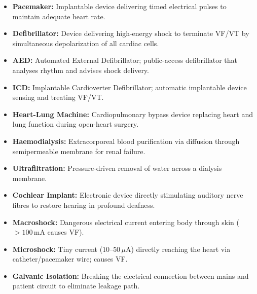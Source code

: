 \documentclass[12pt,a4paper]{article}
\begin{document}
\begin{tcolorbox}[defbox, title={\textbf{One-Line Definitions}}]
\begin{itemize}[leftmargin=*, itemsep=2.5pt, topsep=0pt]
  \item \textbf{Pacemaker:} Implantable device delivering timed electrical pulses to maintain adequate heart rate.
  \item \textbf{Defibrillator:} Device delivering high-energy shock to terminate VF/VT by simultaneous depolarization of all cardiac cells.
  \item \textbf{AED:} Automated External Defibrillator; public-access defibrillator that analyses rhythm and advises shock delivery.
  \item \textbf{ICD:} Implantable Cardioverter Defibrillator; automatic implantable device sensing and treating VF/VT.
  \item \textbf{Heart-Lung Machine:} Cardiopulmonary bypass device replacing heart and lung function during open-heart surgery.
  \item \textbf{Haemodialysis:} Extracorporeal blood purification via diffusion through semipermeable membrane for renal failure.
  \item \textbf{Ultrafiltration:} Pressure-driven removal of water across a dialysis membrane.
  \item \textbf{Cochlear Implant:} Electronic device directly stimulating auditory nerve fibres to restore hearing in profound deafness.
  \item \textbf{Macroshock:} Dangerous electrical current entering body through skin ($> 100\,\text{mA}$ causes VF).
  \item \textbf{Microshock:} Tiny current ($10$--$50\,\mu\text{A}$) directly reaching the heart via catheter/pacemaker wire; causes VF.
  \item \textbf{Galvanic Isolation:} Breaking the electrical connection between mains and patient circuit to eliminate leakage path.
\end{itemize}
\end{tcolorbox}
\end{document}
